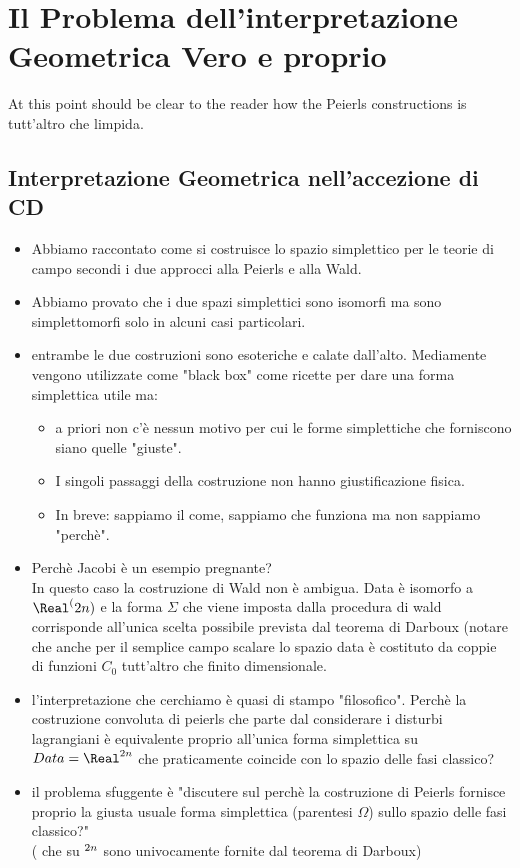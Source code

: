 \documentclass[Cascione]{subfiles}
\begin{document}
	\section{Il Problema dell'interpretazione Geometrica Vero e proprio}
		At this point should be clear to the reader how the Peierls constructions is tutt'altro che limpida.
		


		\subsection{Interpretazione Geometrica nell'accezione di CD}
			\begin{itemize}
				\item Abbiamo raccontato come si costruisce lo spazio simplettico per le teorie di campo secondi i due approcci alla Peierls e alla Wald.
				\item  Abbiamo provato che i due spazi simplettici sono isomorfi ma sono simplettomorfi solo in alcuni casi particolari.
				\item entrambe le due costruzioni sono esoteriche e calate dall'alto. 
					Mediamente vengono utilizzate come "black box" come ricette per dare una forma simplettica utile ma:
				\begin{itemize}
					\item a priori non c'è nessun motivo per cui le forme simplettiche che forniscono siano quelle "giuste".
					\item I singoli passaggi della costruzione non hanno giustificazione fisica.
					\item 	In breve: sappiamo il come, sappiamo che funziona ma non sappiamo "perchè".
				\end{itemize}
				\item Perchè Jacobi è un esempio pregnante?\\
					In questo caso la costruzione di Wald non è ambigua. Data è isomorfo a $\Real^(2n)$ e la forma $\Sigma$ che viene imposta dalla procedura di wald corrisponde all'unica scelta possibile prevista dal teorema di Darboux (notare che anche per il semplice campo scalare lo spazio data è costituto da coppie di funzioni $C_0$ tutt'altro che finito dimensionale.
				\item l'interpretazione che cerchiamo è quasi di stampo "filosofico". Perchè la costruzione convoluta di peierls che parte dal considerare i disturbi lagrangiani è equivalente proprio all'unica forma simplettica su $Data=\Real^{2n}$ che praticamente coincide con lo spazio delle fasi classico?
				\item il problema sfuggente è "discutere sul perchè la costruzione di Peierls fornisce proprio la giusta usuale forma simplettica (parentesi $\Omega$) sullo spazio delle fasi classico?"\\
					( che su $\real^{2n} $ sono univocamente fornite dal teorema di Darboux)			
		\end{itemize}
\end{document}
